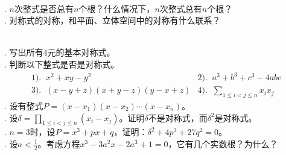 \documentclass[12pt,UTF8]{ctexbook}
\begin{document}

\begin{sk}
    \mbox{} \\
    . $n$次整式是否总有$n$个根？什么情况下，$n$次整式总有$n$个根？\\
    . 对称式的对称，和平面、立体空间中的对称有什么联系？

\end{sk}

\begin{xt}
    \mbox{} \\
    . 写出所有$4$元的基本对称式。\\
    . 判断以下整式是否是对称式。\\
    $$
    \begin{array}{ll}
       1).\;\; x^2 + xy - y^2 & 2).\;\; a^3 + b^3 + c^3 - 4abc \\
       3).\;\;  (x - y + z)(x + y - z)(y - x + z) & 4).\;\; \displaystyle\sum_{1\leqslant i < j \leqslant n} x_i x_j
    \end{array}
    $$
    . 设有整式$P = (x - x_1)(x - x_2) \cdots (x - x_n)$。\\
    . 设$\displaystyle\delta = \prod_{1\leqslant i < j \leqslant n} (x_i - x_j)$。证明$\delta$不是对称式，而$\delta^2$是对称式。\\
    . $n=3$时，设$P = x^3 + px + q$，证明：$\delta^2 + 4p^3 + 27 q^2 = 0$。\\
    . 设$a<\frac{1}{2}$。考虑方程$x^3 - 3a^2x - 2a^3 + 1 = 0$，它有几个实数根？为什么？
\end{xt}

\end{document}
